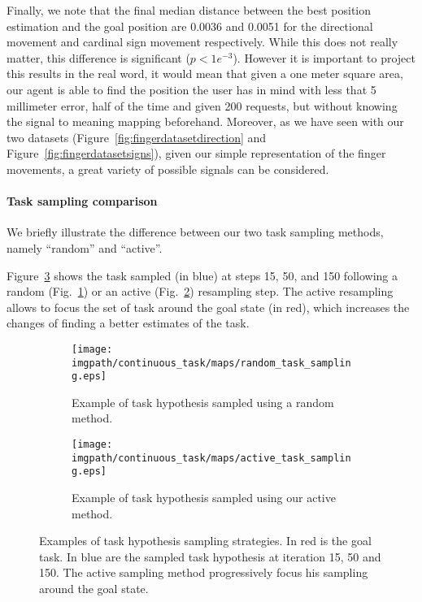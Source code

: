Finally, we note that the final median distance between the best position estimation and the goal position are 0.0036 and 0.0051 for the directional movement and cardinal sign movement respectively. While this does not really matter, this difference is significant ($p< 1e^{-3}$). However it is important to project this results in the real word, it would mean that given a one meter square area, our agent is able to find the position the user has in mind with less that 5 millimeter error, half of the time and given 200 requests, but without knowing the signal to meaning mapping beforehand. Moreover, as we have seen with our two datasets (Figure~\ref{fig:fingerdatasetdirection} and Figure~\ref{fig:fingerdatasetsigns}), given our simple representation of the finger movements, a great variety of possible signals can be considered.

\paragraph{Task sampling comparison}

We briefly illustrate the difference between our two task sampling methods, namely ``random'' and ``active''.

Figure~\ref{fig:continuoustasktasksampling} shows the task sampled (in blue) at steps 15, 50, and 150 following a random (Fig.~\ref{fig:continuoustaskrandomtask}) or an active (Fig.~\ref{fig:continuoustaskactivetask}) resampling step. The active resampling allows to focus the set of task around the goal state (in red), which increases the changes of finding a better estimates of the task.

\begin{figure}[!ht]
\centering
    \begin{subfigure}[b]{\columnwidth}
        \centering
        \texttt{[image: \\imgpath/continuous\_task/maps/random\_task\_sampling.eps]}
        \caption{Example of task hypothesis sampled using a random method.}
        \label{fig:continuoustaskrandomtask}
    \end{subfigure}
    \begin{subfigure}[b]{\columnwidth}
        \centering
        \texttt{[image: \\imgpath/continuous\_task/maps/active\_task\_sampling.eps]}
        \caption{Example of task hypothesis sampled using our active method.}
        \label{fig:continuoustaskactivetask}
    \end{subfigure}
\caption{Examples of task hypothesis sampling strategies. In red is the goal task. In blue are the sampled task hypothesis at iteration 15, 50 and 150. The active sampling method progressively focus his sampling around the goal state.}
\label{fig:continuoustasktasksampling}
\end{figure}


